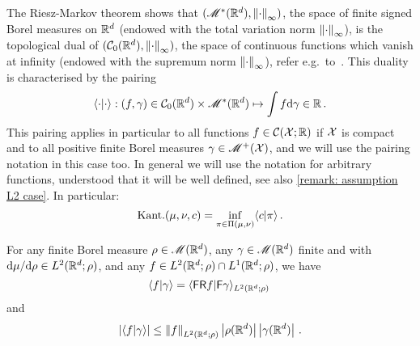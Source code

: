 % 

The Riesz-Markov theorem shows that $(\mathscr{M}^*(\mathbb{R}^d),\left\lVert\cdot\right\rVert_\infty)$, the space of finite signed Borel measures on $\mathbb{R}^d$ (endowed with the total variation norm $\left\lVert\cdot\right\rVert_\infty$), is the topological dual of $(\mathcal{C}_0(\mathbb{R}^d),\left\lVert\cdot\right\rVert_\infty)$, the space of continuous functions which vanish at infinity (endowed with the supremum norm $\left\lVert\cdot\right\rVert_\infty$), refer e.g.\ to~\cite[p.~242]{constantin_fourier_2016}. This duality is characterised by the pairing
\[
    \langle \cdot\vert\cdot\rangle: (f,\gamma
)\in\mathcal{C}_0(\mathbb{R}^d)\times\mathscr{M}^*(\mathbb{R}^d)\mapsto \int f \mathrm{d} \gamma
 \in \mathbb{R}\,.
\]
This pairing applies in particular to all functions $f\in\mathcal{C}(\mathcal{X};\mathbb{R})$ if $\mathcal{X}$ is compact and to all positive finite Borel measures $\gamma\in\mathscr{M}^+(\mathcal{X})$, and we will use the pairing notation in this case too. In general we will use the notation for arbitrary functions, understood that it will be well defined, see also \cref{remark: assumption L2 case}. In particular:
\[
\text{Kant.}(\mu,\nu,c) = \inf_{\pi\in\Pi(\mu,\nu)}\langle c\vert \pi\rangle\,.
\] 

\begin{lemma}\label{lemma: finiteness of IP}
    For any finite Borel measure $\rho\in\mathscr{M}(\mathbb{R}^d)$, any $\gamma\in\mathscr{M}(\mathbb{R}^d)$ finite and with $\mathrm{d}\mu/\mathrm{d}\rho\in L^2(\mathbb{R}^d;\rho)$, and any $f\in L^2(\mathbb{R}^d;\rho)\cap L^1(\mathbb{R}^d;\rho)$, we have
    \[
        \langle f\vert \gamma\rangle = \langle \mathsf{F}\mathsf{R} f\vert \mathsf{F}\gamma\rangle_{L^2(\mathbb{R}^d;\rho)}\,
    \]
    and 
    \[
        \left\lvert \langle f\vert \gamma\rangle \right\rvert\le \left\lVert f\right\rVert_{L^2(\mathbb{R}^d;\rho)}\left\lvert \rho(\mathbb{R}^d) \right\rvert\left\lvert \gamma(\mathbb{R}^d) \right\rvert\,.
    \]
\end{lemma}

